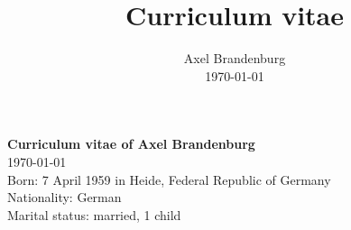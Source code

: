 \documentclass{article}
\date{}
\title{\bf Curriculum vitae}
\author{Axel Brandenburg\\
\small\today\normalsize}
\begin{document}
\noindent\LARGE{\bf Curriculum vitae of Axel Brandenburg}\normalsize\\
\small \today \normalsize
\\

\noindent
Born: 7 April 1959 in Heide, Federal Republic of Germany\\
Nationality: German\\
Marital status: married, 1 child\\
\vspace{-4mm}
\end{document}
